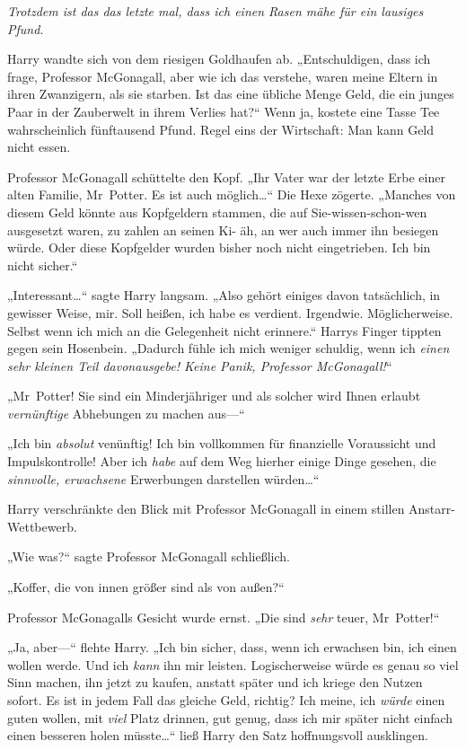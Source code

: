 {\emph{Trotzdem ist das das letzte mal, dass ich einen Rasen mähe für ein lausiges Pfund.}

Harry wandte sich von dem riesigen Goldhaufen ab. „Entschuldigen, dass ich frage, Professor McGonagall, aber wie ich das verstehe, waren meine Eltern in ihren Zwanzigern, als sie starben. Ist das eine übliche Menge Geld, die ein junges Paar in der Zauberwelt in ihrem Verlies hat?“ Wenn ja, kostete eine Tasse Tee wahrscheinlich fünftausend Pfund. Regel eins der Wirtschaft: Man kann Geld nicht essen.

Professor McGonagall schüttelte den Kopf. „Ihr Vater war der letzte Erbe einer alten Familie, Mr~Potter. Es ist auch möglich…“ Die Hexe zögerte. „Manches von diesem Geld könnte aus Kopfgeldern stammen, die auf Sie-wissen-schon-wen ausgesetzt waren, zu zahlen an seinen Ki- äh, an wer auch immer ihn besiegen würde. Oder diese Kopfgelder wurden bisher noch nicht eingetrieben. Ich bin nicht sicher.“

„Interessant…“ sagte Harry langsam. „Also gehört einiges davon tatsächlich, in gewisser Weise, mir. Soll heißen, ich habe es verdient. Irgendwie. Möglicherweise. Selbst wenn ich mich an die Gelegenheit nicht erinnere.“ Harrys Finger tippten gegen sein Hosenbein. „Dadurch fühle ich mich weniger schuldig, wenn ich \emph{einen sehr kleinen Teil davonausgebe! Keine Panik, Professor McGonagall!}“

„Mr~Potter! Sie sind ein Minderjähriger und als solcher wird Ihnen erlaubt \emph{vernünftige} Abhebungen zu machen aus—“

„Ich bin \emph{absolut} venünftig! Ich bin vollkommen für finanzielle Voraussicht und Impulskontrolle! Aber ich \emph{habe} auf dem Weg hierher einige Dinge gesehen, die \emph{sinnvolle, erwachsene} Erwerbungen darstellen würden…“

Harry verschränkte den Blick mit Professor McGonagall in einem stillen Anstarr-Wettbewerb.

„Wie was?“ sagte Professor McGonagall schließlich.

„Koffer, die von innen größer sind als von außen?“

Professor McGonagalls Gesicht wurde ernst. „Die sind \emph{sehr} teuer, Mr~Potter!“

„Ja, aber—“ flehte Harry. „Ich bin sicher, dass, wenn ich erwachsen bin, ich einen wollen werde. Und ich \emph{kann} ihn mir leisten. Logischerweise würde es genau so viel Sinn machen, ihn jetzt zu kaufen, anstatt später und ich kriege den Nutzen sofort. Es ist in jedem Fall das gleiche Geld, richtig? Ich meine, ich \emph{würde} einen guten wollen, mit \emph{viel} Platz drinnen, gut genug, dass ich mir später nicht einfach einen besseren holen müsste…“ ließ Harry den Satz hoffnungsvoll ausklingen.

}
